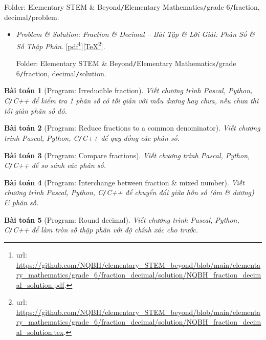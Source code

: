 \documentclass[12pt,oneside]{book}
\newtheorem{baitoan}{Bài toán}
\begin{document}
\begin{enumerate}
	Folder: {\sf Elementary STEM \& Beyond{\tt/}Elementary Mathematics{\tt/}grade 6{\tt/}fraction, decimal{\tt/}problem}.
	\begin{itemize}
		\item {\it Problem \& Solution: Fraction \& Decimal -- Bài Tập \& Lời Giải: Phân Số {\it\&} Số Thập Phân}. [\href{https://github.com/NQBH/elementary_STEM_beyond/blob/main/elementary_mathematics/grade_6/fraction_decimal/solution/NQBH_fraction_decimal_solution.pdf}{pdf}\footnote{{\sc url}: \url{https://github.com/NQBH/elementary_STEM_beyond/blob/main/elementary_mathematics/grade_6/fraction_decimal/solution/NQBH_fraction_decimal_solution.pdf}.}][\href{https://github.com/NQBH/elementary_STEM_beyond/blob/main/elementary_mathematics/grade_6/fraction_decimal/solution/NQBH_fraction_decimal_solution.tex}{\TeX}\footnote{{\sc url}: \url{https://github.com/NQBH/elementary_STEM_beyond/blob/main/elementary_mathematics/grade_6/fraction_decimal/solution/NQBH_fraction_decimal_solution.tex}.}].
		
		Folder: {\sf Elementary STEM \& Beyond{\tt/}Elementary Mathematics{\tt/}grade 6{\tt/}fraction, decimal{\tt/}solution}.
	\end{itemize}
	
	\begin{baitoan}[{\sf Program}: Irreducible fraction]
		Viết chương trình {\sf Pascal, Python, C{\tt/}C++} để kiểm tra 1 phân số có tối giản với mẫu dương hay chưa, nếu chưa thì tối giản phân số đó.
	\end{baitoan}
	
	\begin{baitoan}[{\sf Program}: Reduce fractions to a common denominator]
		Viết chương trình {\sf Pascal, Python, C{\tt/}C++} để quy đồng các phân số.
	\end{baitoan}
	
	\begin{baitoan}[{\sf Program}: Compare fractions]
		Viết chương trình {\sf Pascal, Python, C{\tt/}C++} để so sánh các phân số.
	\end{baitoan}
	
	\begin{baitoan}[{\sf Program}: Interchange between fraction \& mixed number]
		Viết chương trình {\sf Pascal, Python, C{\tt/}C++} để chuyển đổi giữa hỗn số (âm \& dương) \& phân số.
	\end{baitoan}
	
	\begin{baitoan}[{\sf Program}: Round decimal]
		Viết chương trình {\sf Pascal, Python, C{\tt/}C++} để làm tròn số thập phân với độ chính xác cho trước.
	\end{baitoan}
	

\end{enumerate}
\end{document}
